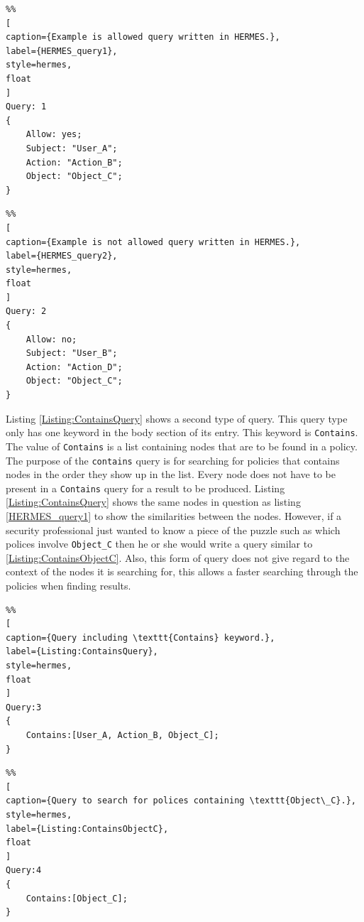 \documentclass[12pt,letterpaper]{report}
\begin{document}
\begin{lstlisting}%%
[
caption={Example is allowed query written in HERMES.},
label={HERMES_query1},
style=hermes,
float
]
Query: 1
{
	Allow: yes;
	Subject: "User_A";
	Action: "Action_B";
	Object: "Object_C";
}
\end{lstlisting}

\begin{lstlisting}%%
[
caption={Example is not allowed query written in HERMES.},
label={HERMES_query2},
style=hermes,
float
]
Query: 2
{
	Allow: no;
	Subject: "User_B";
	Action: "Action_D";
	Object: "Object_C";
}
\end{lstlisting}


Listing \ref{Listing:ContainsQuery} shows a second type of query. This query type only has one keyword in the body section of its entry. This keyword is \texttt{Contains}. The value of \texttt{Contains} is a list containing nodes that are to be found in a policy. The purpose of the \texttt{contains} query is for searching for policies that contains nodes in the order they show up in the list. Every node does not have to be present in a \texttt{Contains} query for a result to be produced. Listing \ref{Listing:ContainsQuery} shows the same nodes in question as listing \ref{HERMES_query1} to show the similarities between the nodes. However, if a security professional just wanted to know a piece of the puzzle such as which polices involve \texttt{Object\_C} then he or she would write a query similar to \ref{Listing:ContainsObjectC}. Also, this form of query does not give regard to the context of the nodes it is searching for, this allows a faster searching through the policies when finding results. 


\begin{lstlisting}%%
[
caption={Query including \texttt{Contains} keyword.},
label={Listing:ContainsQuery},
style=hermes,
float
]
Query:3
{
	Contains:[User_A, Action_B, Object_C];
}
\end{lstlisting}

\begin{lstlisting}%%
[
caption={Query to search for polices containing \texttt{Object\_C}.},
style=hermes,
label={Listing:ContainsObjectC},
float
]
Query:4
{
	Contains:[Object_C];
}
\end{lstlisting}
\end{document}
